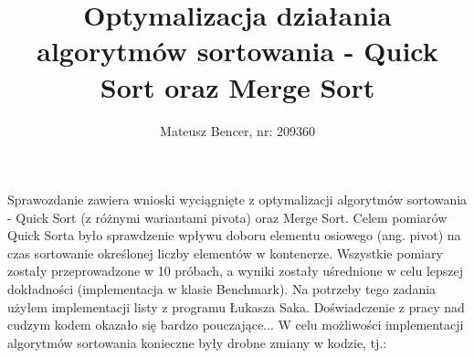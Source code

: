 \documentclass[11pt]{article}
\title{Optymalizacja działania algorytmów sortowania - Quick Sort oraz Merge Sort}
\author{Mateusz Bencer, nr: 209360}
\begin{document}
\maketitle
Sprawozdanie zawiera wnioski wyciągnięte z optymalizacji algorytmów sortowania - Quick Sort (z różnymi wariantami pivota) oraz Merge Sort. Celem pomiarów Quick Sorta było sprawdzenie wpływu doboru elementu osiowego (ang. pivot) 
na czas sortowanie określonej liczby elementów w kontenerze. Wszystkie pomiary zostały przeprowadzone w 10 próbach, a wyniki zostały uśrednione w celu lepszej dokładności (implementacja w klasie Benchmark). Na potrzeby tego zadania użyłem implementacji listy z programu Łukasza Saka. Doświadczenie z pracy nad cudzym kodem okazało się bardzo pouczające...
\newline
W celu możliwości implementacji algorytmów sortowania konieczne były drobne zmiany w kodzie, tj.:
\end{document}
